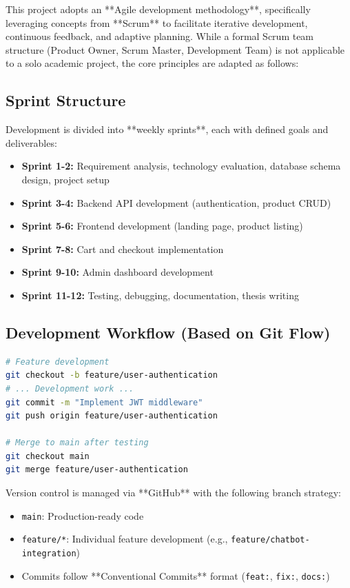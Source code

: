This project adopts an **Agile development methodology**, specifically leveraging concepts from **Scrum** to facilitate iterative development, continuous feedback, and adaptive planning. While a formal Scrum team structure (Product Owner, Scrum Master, Development Team) is not applicable to a solo academic project, the core principles are adapted as follows:

\subsection{Sprint Structure}

Development is divided into **weekly sprints**, each with defined goals and deliverables:

\begin{itemize}
    \item \textbf{Sprint 1-2:} Requirement analysis, technology evaluation, database schema design, project setup
    \item \textbf{Sprint 3-4:} Backend API development (authentication, product CRUD)
    \item \textbf{Sprint 5-6:} Frontend development (landing page, product listing)
    \item \textbf{Sprint 7-8:} Cart and checkout implementation
    \item \textbf{Sprint 9-10:} Admin dashboard development
    \item \textbf{Sprint 11-12:} Testing, debugging, documentation, thesis writing
\end{itemize}

\subsection{Development Workflow (Based on Git Flow)}

\vspace{0.3cm}
\begin{lstlisting}[language=bash, caption=Git Branching Strategy Example]
# Feature development
git checkout -b feature/user-authentication
# ... Development work ...
git commit -m "Implement JWT middleware"
git push origin feature/user-authentication

# Merge to main after testing
git checkout main
git merge feature/user-authentication
\end{lstlisting}

Version control is managed via **GitHub** with the following branch strategy:

\begin{itemize}
    \item \texttt{main}: Production-ready code
    \item \texttt{feature/*}: Individual feature development (e.g., \texttt{feature/chatbot-integration})
    \item Commits follow **Conventional Commits** format (\texttt{feat:}, \texttt{fix:}, \texttt{docs:})
\end{itemize}

